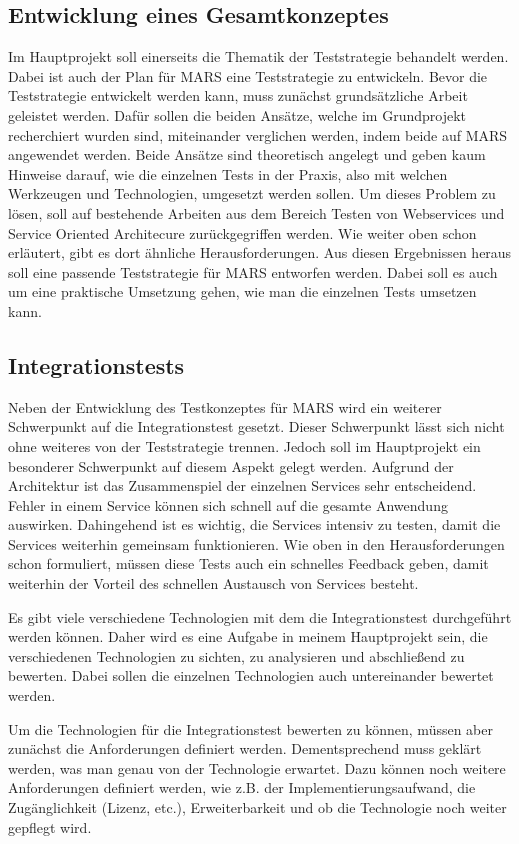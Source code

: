 \documentclass{llncs}
\begin{document}
\subsection{Entwicklung eines Gesamtkonzeptes}
Im Hauptprojekt soll einerseits die Thematik der Teststrategie behandelt werden. Dabei ist auch der Plan für MARS eine Teststrategie zu entwickeln. Bevor die Teststrategie entwickelt werden kann, muss zunächst grundsätzliche Arbeit geleistet werden. Dafür sollen die beiden Ansätze, welche im Grundprojekt recherchiert wurden sind, miteinander verglichen werden, indem beide auf MARS angewendet werden. Beide Ansätze sind theoretisch angelegt und geben kaum Hinweise darauf, wie die einzelnen Tests in der Praxis, also mit welchen Werkzeugen und Technologien, umgesetzt werden sollen. Um dieses Problem zu lösen, soll auf bestehende Arbeiten aus dem Bereich Testen von Webservices und Service Oriented Architecure zurückgegriffen werden. Wie weiter oben schon erläutert, gibt es dort ähnliche Herausforderungen. Aus diesen Ergebnissen heraus soll eine passende Teststrategie für MARS entworfen werden. Dabei soll es auch um eine praktische Umsetzung gehen, wie man die einzelnen Tests umsetzen kann. 

\subsection{Integrationstests}
Neben der Entwicklung des Testkonzeptes für MARS wird ein weiterer Schwerpunkt auf die Integrationstest gesetzt. Dieser Schwerpunkt lässt sich nicht ohne weiteres von der Teststrategie trennen. Jedoch soll im Hauptprojekt ein besonderer Schwerpunkt auf diesem Aspekt gelegt werden. Aufgrund der Architektur ist das Zusammenspiel der einzelnen Services sehr entscheidend. Fehler in einem Service können sich schnell auf die gesamte Anwendung auswirken. Dahingehend ist es wichtig, die Services intensiv zu testen, damit die Services weiterhin gemeinsam funktionieren. Wie oben in den Herausforderungen schon formuliert, müssen diese Tests auch ein schnelles Feedback geben, damit weiterhin der Vorteil des schnellen Austausch von Services besteht. 

Es gibt viele verschiedene Technologien mit dem die Integrationstest durchgeführt werden können. Daher wird es eine Aufgabe in meinem Hauptprojekt sein, die verschiedenen Technologien zu sichten, zu analysieren und abschließend zu bewerten. Dabei sollen die einzelnen Technologien auch untereinander bewertet werden.

Um die Technologien für die Integrationstest bewerten zu können, müssen aber zunächst die Anforderungen definiert werden. Dementsprechend muss geklärt werden, was man genau von der Technologie erwartet. Dazu können noch weitere Anforderungen definiert werden, wie z.B. der Implementierungsaufwand, die Zugänglichkeit (Lizenz, etc.), Erweiterbarkeit und ob die Technologie noch weiter gepflegt wird.
\end{document}
